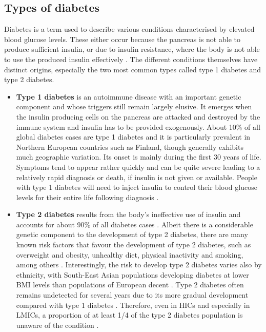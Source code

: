  
\subsection{Types of diabetes}

Diabetes is a term used to describe various conditions characterised by elevated blood glucose levels. These either occur because the pancreas is not able to produce sufficient insulin, or due to insulin resistance, where the body is not able to use the produced insulin effectively \parencite{WorldHealthOrganization2016}. The different conditions themselves have distinct origins, especially the two most common types called type 1 diabetes and type 2 diabetes. 

\begin{itemize}
\item \textbf{Type 1 diabetes} is an autoimmune disease with an important genetic component and whose triggers still remain largely elusive. It emerges when the insulin producing cells on the pancreas are attacked and destroyed by the immune system and insulin has to be provided exogenously. About 10\% of all global diabetes cases are type 1 diabetes and it is particularly prevalent in Northern European countries such as Finland, though generally exhibits much geographic variation. Its onset is mainly during the first 30 years of life. Symptoms tend to appear rather quickly and can be quite severe leading to a relatively rapid diagnosis or death, if insulin is not given or available. People with type 1 diabetes will need to inject insulin to control their blood glucose levels for their entire life following diagnosis \parencite{Tuomilehto2013}. 
\item \textbf{Type 2 diabetes} results from the body's ineffective use of insulin and accounts for about 90\% of all diabetes cases \parencite{WorldHealthOrganization2016}. Albeit there is a considerable genetic component to the development of type 2 diabetes, there are many known risk factors that favour the development of type 2 diabetes, such as overweight and obesity, unhealthy diet, physical inactivity and smoking, among others \parencite{WorldHealthOrganization2016, AmericanDiabetesAssociation2014}. Interestingly, the risk to develop type 2 diabetes varies also by ethnicity, with South-East Asian populations developing diabetes at lower \ac{BMI} levels than populations of European decent \parencite{Ramachandran2010}. Type 2 diabetes often remains undetected for several years due to its more gradual development compared with type 1 diabetes \parencite{AmericanDiabetesAssociation2014}. Therefore, even in \acp{HIC} and especially in \acp{LMIC}, a proportion of at least 1/4 of the type 2 diabetes population is unaware of the condition \parencite{Beagley2014}. 
\end{itemize}

